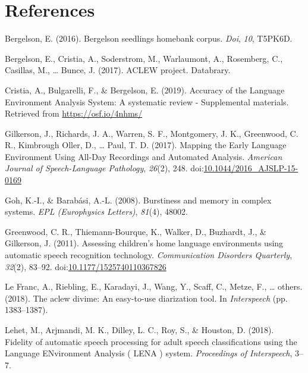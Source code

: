 \documentclass[english,floatsintext,man]{apa6}
\begin{document}
\newpage

\section{References}\label{references}

\setlength{\parindent}{-0.5in} \setlength{\leftskip}{0.5in}

\hypertarget{refs}{}
\hypertarget{ref-bergelson2016bergelson}{}
Bergelson, E. (2016). Bergelson seedlings homebank corpus. \emph{Doi},
\emph{10}, T5PK6D.

\hypertarget{ref-bergelson2017}{}
Bergelson, E., Cristia, A., Soderstrom, M., Warlaumont, A., Rosemberg,
C., Casillas, M., \ldots{} Bunce, J. (2017). ACLEW project. Databrary.

\hypertarget{ref-Cristia}{}
Cristia, A., Bulgarelli, F., \& Bergelson, E. (2019). Accuracy of the
Language Environment Analysis System: A systematic review - Supplemental
materials. Retrieved from \url{https://osf.io/4nhms/}

\hypertarget{ref-Gilkerson2017}{}
Gilkerson, J., Richards, J. A., Warren, S. F., Montgomery, J. K.,
Greenwood, C. R., Kimbrough Oller, D., \ldots{} Paul, T. D. (2017).
Mapping the Early Language Environment Using All-Day Recordings and
Automated Analysis. \emph{American Journal of Speech-Language
Pathology}, \emph{26}(2), 248.
doi:\href{https://doi.org/10.1044/2016_AJSLP-15-0169}{10.1044/2016\_AJSLP-15-0169}

\hypertarget{ref-goh2008burstiness}{}
Goh, K.-I., \& Barabási, A.-L. (2008). Burstiness and memory in complex
systems. \emph{EPL (Europhysics Letters)}, \emph{81}(4), 48002.

\hypertarget{ref-Greenwood2011}{}
Greenwood, C. R., Thiemann-Bourque, K., Walker, D., Buzhardt, J., \&
Gilkerson, J. (2011). Assessing children's home language environments
using automatic speech recognition technology. \emph{Communication
Disorders Quarterly}, \emph{32}(2), 83--92.
doi:\href{https://doi.org/10.1177/1525740110367826}{10.1177/1525740110367826}

\hypertarget{ref-le2018aclew}{}
Le Franc, A., Riebling, E., Karadayi, J., Wang, Y., Scaff, C., Metze,
F., \ldots{} others. (2018). The aclew divime: An easy-to-use
diarization tool. In \emph{Interspeech} (pp. 1383--1387).

\hypertarget{ref-Lehet2018}{}
Lehet, M., Arjmandi, M. K., Dilley, L. C., Roy, S., \& Houston, D.
(2018). Fidelity of automatic speech processing for adult speech
classifications using the Language ENvironment Analysis ( LENA ) system.
\emph{Proceedings of Interspeech}, 3--7.
\end{document}
